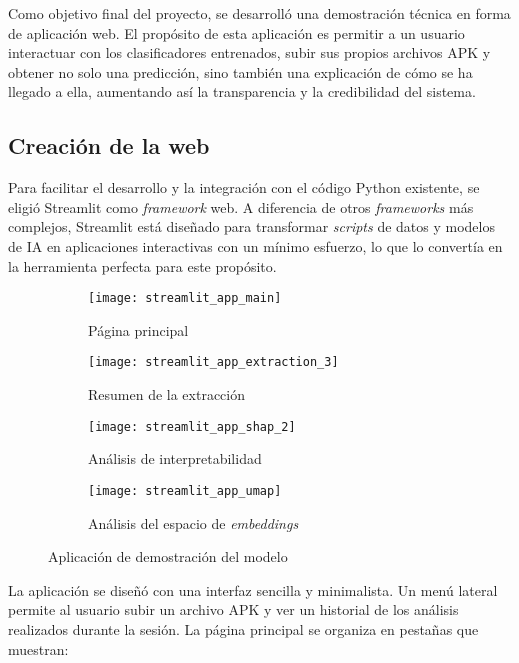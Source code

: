 Como objetivo final del proyecto, se desarrolló una demostración técnica en forma de aplicación web. El propósito de esta aplicación es permitir a un usuario interactuar con los clasificadores entrenados, subir sus propios archivos APK y obtener no solo una predicción, sino también una explicación de cómo se ha llegado a ella, aumentando así la transparencia y la credibilidad del sistema.

\subsection{Creación de la web}

Para facilitar el desarrollo y la integración con el código Python existente, se eligió Streamlit como \textit{framework} web. A diferencia de otros \textit{frameworks} más complejos, Streamlit está diseñado para transformar \textit{scripts} de datos y modelos de IA en aplicaciones interactivas con un mínimo esfuerzo, lo que lo convertía en la herramienta perfecta para este propósito.

\begin{figure}[!h]
	\centering
	\begin{subfigure}{0.5\linewidth}
		\texttt{[image: streamlit\_app\_main]} 
		\caption{Página principal}
		\label{fig:streamlitMain}
	\end{subfigure}\hfill
	\begin{subfigure}{0.5\linewidth}
		\texttt{[image: streamlit\_app\_extraction\_3]}
		\caption{Resumen de la extracción}
		\label{fig:streamlitExtraction}
	\end{subfigure}
	
	\begin{subfigure}{0.5\linewidth}
		\texttt{[image: streamlit\_app\_shap\_2]}
		\caption{Análisis de interpretabilidad}
		\label{fig:streamlitSHAP}
	\end{subfigure}\hfill
	\begin{subfigure}{0.5\linewidth}
		\texttt{[image: streamlit\_app\_umap]}
		\caption{Análisis del espacio de \textit{embeddings}}
		\label{fig:streamlitUMAP}
	\end{subfigure}
	
	\caption{Aplicación de demostración del modelo}
	\label{fig:streamlitApp}
\end{figure}


La aplicación se diseñó con una interfaz sencilla y minimalista. Un menú lateral permite al usuario subir un archivo APK y ver un historial de los análisis realizados durante la sesión. La página principal se organiza en pestañas que muestran:

